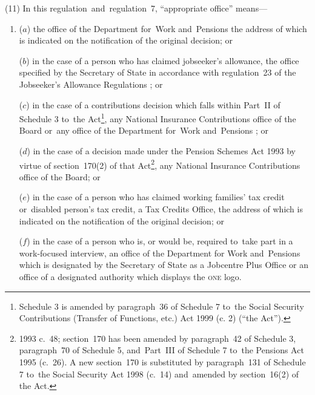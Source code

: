 \documentclass[12pt,a4paper]{article}
\begin{document}
(11) In this regulation~and~regulation~7, “appropriate office” means---
\begin{enumerate}\item[]
($a$) the office of the 
Department for~Work and~Pensions  %
the address of which is indicated on the notification of the original decision; or

($b$) in the case of a person who has claimed jobseeker’s allowance, the office specified by the Secretary of State in accordance with regulation~23 of the Jobseeker’s Allowance Regulations%
; or

    ($c$) 
    in the case of a contributions decision which falls within Part~II of Schedule 3 to~the Act\footnote{\frenchspacing Schedule 3 is amended by paragraph~36 of Schedule 7 to~the Social Security Contributions (Transfer of Functions, etc.) Act 1999 (c. 2) (“the Act”).}, any National Insurance Contributions office of the Board or~any office of the 
Department for~Work and~Pensions%
; or

    ($d$) 
    in the case of a decision made under the Pension Schemes Act 1993 by virtue of section~170(2) of that Act\footnote{1993 c.~48; section~170 has been amended by paragraph~42 of Schedule 3, paragraph~70 of Schedule 5, and~Part~III of Schedule 7 to~the Pensions Act 1995 (c.~26). A new section~170 is substituted by paragraph~131 of Schedule 7 to~the Social Security Act 1998 (c.~14) and~amended by section~16(2) of the Act.}, any National Insurance Contributions office of the Board;
or

($e$) in the case of a person who has claimed working families' tax credit or~disabled person’s tax credit, a Tax Credits Office, the address of which is indicated on the notification of the original decision;
or


($f$) in the case of a person who is, or would be, required to~take part in a work-focused interview, an office of the Department for Work and~Pensions which is designated by the Secretary of State as a Jobcentre Plus Office or an office of a designated authority which displays the \textsc{\lowercase{ONE}} logo.
\end{enumerate}
\end{document}
